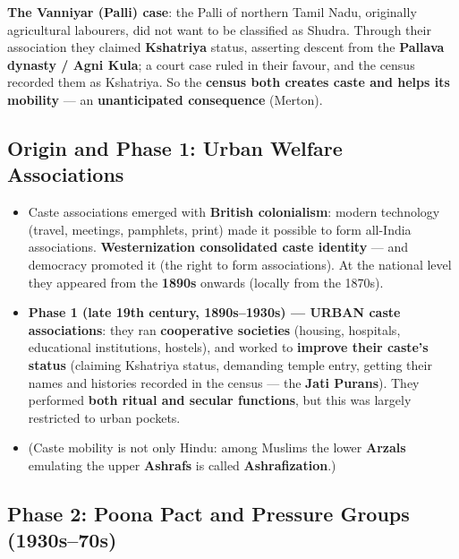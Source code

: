 \begin{ExampleBox}
\textbf{The Vanniyar (Palli) case}: the Palli of northern Tamil Nadu, originally agricultural labourers, did not want to be classified as Shudra. Through their association they claimed \textbf{Kshatriya} status, asserting descent from the \textbf{Pallava dynasty / Agni Kula}; a court case ruled in their favour, and the census recorded them as Kshatriya. So the \textbf{census both creates caste and helps its mobility} --- an \textbf{unanticipated consequence} (Merton).
\end{ExampleBox}

\subsection{Origin and Phase 1: Urban Welfare Associations}

\begin{KeyConcept}
\begin{itemize}
\item Caste associations emerged with \textbf{British colonialism}: modern technology (travel, meetings, pamphlets, print) made it possible to form all-India associations. \textbf{Westernization consolidated caste identity} --- and democracy promoted it (the right to form associations). At the national level they appeared from the \textbf{1890s} onwards (locally from the 1870s).
\item \textbf{Phase 1 (late 19th century, 1890s--1930s) --- URBAN caste associations}: they ran \textbf{cooperative societies} (housing, hospitals, educational institutions, hostels), and worked to \textbf{improve their caste's status} (claiming Kshatriya status, demanding temple entry, getting their names and histories recorded in the census --- the \textbf{Jati Purans}). They performed \textbf{both ritual and secular functions}, but this was largely restricted to urban pockets.
\item (Caste mobility is not only Hindu: among Muslims the lower \textbf{Arzals} emulating the upper \textbf{Ashrafs} is called \textbf{Ashrafization}.)
\end{itemize}
\end{KeyConcept}

\subsection{Phase 2: Poona Pact and Pressure Groups (1930s--70s)}

